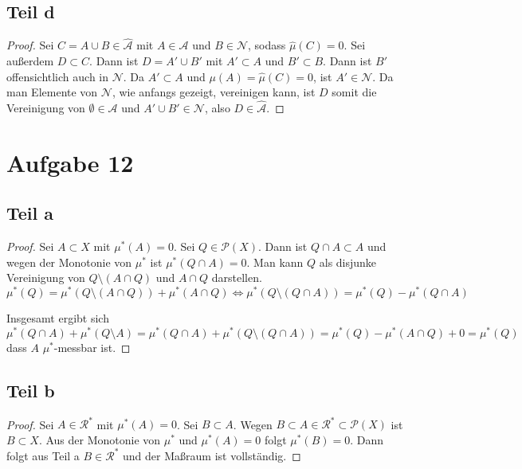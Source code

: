 \documentclass[10pt,a4paper]{article}
\begin{document}
\subsection{Teil d}
\begin{proof}
  Sei $C = A \cup B \in \widehat{\mathscr{A}}$ mit $A \in \mathscr{A}$ und $B \in \mathscr{N}$, sodass $\widehat{\mu}(C) = 0$.
  Sei außerdem $D \subset C$.
  Dann ist $D = A' \cup B'$ mit $A' \subset A$ und $B' \subset B$.
  Dann ist $B'$ offensichtlich auch in $\mathscr{N}$.
  Da $A' \subset A$ und $\mu(A) = \widehat{\mu}(C) = 0$, ist $A' \in \mathscr{N}$.
  Da man Elemente von $\mathscr{N}$, wie anfangs gezeigt, vereinigen kann, ist $D$ somit die Vereinigung von $\emptyset \in \mathscr{A}$ und $A' \cup B' \in \mathscr{N}$, also $D \in \widehat{\mathscr{A}}$.
\end{proof}

\section{Aufgabe 12}

\subsection{Teil a}
\begin{proof}
  Sei $A \subset X$ mit $\mu^{*}(A) = 0$.
  Sei $Q \in \mathscr{P}(X)$.
  Dann ist $Q \cap A \subset A$ und wegen der Monotonie von $\mu^{*}$ ist $\mu^{*}(Q \cap A) = 0$.
  Man kann $Q$ als disjunke Vereinigung von $Q \setminus (A \cap Q)$ und $A \cap Q$ darstellen.
  \begin{equation}
    \mu^{*}(Q) = \mu^{*}(Q \setminus (A \cap Q)) + \mu^{*}(A \cap Q) \Leftrightarrow \mu^{*}(Q \setminus (Q \cap A)) = \mu^{*}(Q) - \mu^{*}(Q \cap A)
  \end{equation}
  
  Insgesamt ergibt sich
  \begin{equation}
    \mu^{*}(Q \cap A) + \mu^{*}(Q \setminus A) = \mu^{*}(Q \cap A) + \mu^{*}(Q \setminus (Q \cap A)) = \mu^{*}(Q) - \mu^{*}(A \cap Q) + 0 = \mu^{*}(Q)
  \end{equation}
  dass $A$ $\mu^{*}$-messbar ist.
\end{proof}

\subsection{Teil b}
\begin{proof}
  Sei $A \in \mathscr{R}^{*}$ mit $\mu^{*}(A) = 0$.
  Sei $B \subset A$.
  Wegen $B \subset A \in \mathscr{R}^{*} \subset \mathscr{P}(X)$ ist $B \subset X$.
  Aus der Monotonie von $\mu^{*}$ und $\mu^{*}(A) = 0$ folgt $\mu^{*}(B) = 0$.
  Dann folgt aus Teil a $B \in \mathscr{R}^{*}$ und der Maßraum ist vollständig.
\end{proof}
\end{document}
